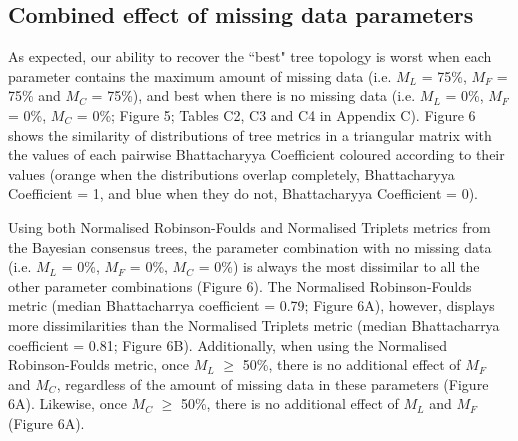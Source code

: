 \documentclass[12pt,letterpaper]{article}
\begin{document}
\subsection{Combined effect of missing data parameters}
As expected, our ability to recover the ``best" tree topology is worst when each parameter contains the maximum amount of missing data (i.e. $M_{L}$ = 75\%, $M_{F}$ = 75\% and $M_{C}$ = 75\%), and best when there is no missing data (i.e. $M_{L}$ = 0\%, $M_{F}$ = 0\%, $M_{C}$ = 0\%; Figure 5; Tables C2, C3 and C4 in Appendix C).
Figure 6 shows the similarity of distributions of tree metrics in a triangular matrix with the values of each pairwise Bhattacharyya Coefficient coloured according to their values (orange when the distributions overlap completely, Bhattacharyya Coefficient = 1, and blue when they do not, Bhattacharyya Coefficient = 0). 


Using both Normalised Robinson-Foulds and Normalised Triplets metrics from the Bayesian consensus trees, the parameter combination with no missing data (i.e. $M_{L}$ = 0\%, $M_{F}$ = 0\%, $M_{C}$ = 0\%) is always the most dissimilar to all the other parameter combinations (Figure 6).
The Normalised Robinson-Foulds metric (median Bhattacharrya coefficient = 0.79; Figure 6A), however, displays more dissimilarities than the Normalised Triplets metric (median Bhattacharrya coefficient = 0.81; Figure 6B).
Additionally, when using the Normalised Robinson-Foulds metric, once $M_{L}$ $\geq$ 50\%, there is no additional effect of $M_{F}$ and $M_{C}$, regardless of the amount of missing data in these parameters (Figure 6A).
Likewise, once $M_{C}$ $\geq$ 50\%, there is no additional effect of $M_{L}$ and $M_{F}$ (Figure 6A).
\end{document}
